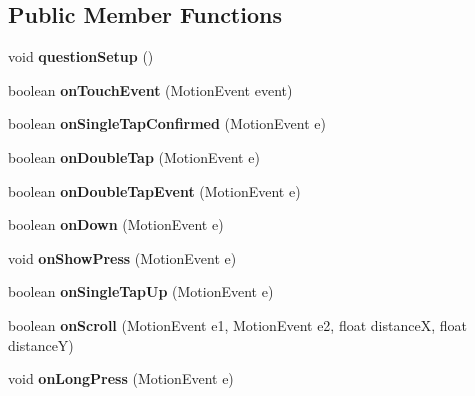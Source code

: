 \subsection*{Public Member Functions}
\begin{DoxyCompactItemize}
\item 
void {\bfseries question\+Setup} ()\label{classcom_1_1roninsamakun_1_1csbraintraining_1_1_game_activity_a2275dd95beef93f02e90a772d9d5afb7}

\item 
boolean {\bfseries on\+Touch\+Event} (Motion\+Event event)\label{classcom_1_1roninsamakun_1_1csbraintraining_1_1_game_activity_a5465a8e4b92e01d7df26261df4aeab50}

\item 
boolean {\bfseries on\+Single\+Tap\+Confirmed} (Motion\+Event e)\label{classcom_1_1roninsamakun_1_1csbraintraining_1_1_game_activity_a3943cb7d1b48166f95074f5ace53f75c}

\item 
boolean {\bfseries on\+Double\+Tap} (Motion\+Event e)\label{classcom_1_1roninsamakun_1_1csbraintraining_1_1_game_activity_ad11377d0a6723aef66d7f2ab883c0d4c}

\item 
boolean {\bfseries on\+Double\+Tap\+Event} (Motion\+Event e)\label{classcom_1_1roninsamakun_1_1csbraintraining_1_1_game_activity_aea5e76678720184c065ff205398f3dc3}

\item 
boolean {\bfseries on\+Down} (Motion\+Event e)\label{classcom_1_1roninsamakun_1_1csbraintraining_1_1_game_activity_affb73fe267cd84042ca7b34ece935e5b}

\item 
void {\bfseries on\+Show\+Press} (Motion\+Event e)\label{classcom_1_1roninsamakun_1_1csbraintraining_1_1_game_activity_a5dce66b8bf3fa41df36d29e88d4c0572}

\item 
boolean {\bfseries on\+Single\+Tap\+Up} (Motion\+Event e)\label{classcom_1_1roninsamakun_1_1csbraintraining_1_1_game_activity_a392f6ae80889701ea5e16afeed718a2e}

\item 
boolean {\bfseries on\+Scroll} (Motion\+Event e1, Motion\+Event e2, float distance\+X, float distance\+Y)\label{classcom_1_1roninsamakun_1_1csbraintraining_1_1_game_activity_aebf76c29087f848b019ac7d742f607f4}

\item 
void {\bfseries on\+Long\+Press} (Motion\+Event e)\label{classcom_1_1roninsamakun_1_1csbraintraining_1_1_game_activity_a5cde69649c902c8b5de38cb8f6c6a84c}


\end{DoxyCompactItemize}
